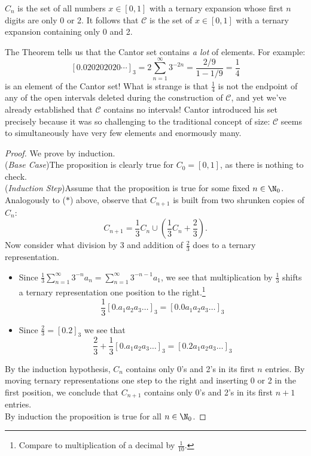 \begin{thm}
$C_n$ is the set of all numbers $x\in[0,1]$ with a ternary expansion whose first $n$ digits are only 0 or 2. It follows that $\mathcal C$ is the set of $x\in[0,1]$ with a ternary expansion containing only 0 and 2.
\end{thm}

\noindent The Theorem tells us that the Cantor set contains \emph{a lot} of elements. For example:
\[[0.020202020\cdots]_3=2\sum_{n=1}^\infty 3^{-2n}=\frac{2/9}{1-1/9}=\frac 14\]
is an element of the Cantor set! What is strange is that $\frac 14$ is not the endpoint of any of the open intervals deleted during the construction of $\mathcal C$, and yet we've already established that $\mathcal C$ contains no intervals! Cantor introduced his set precisely because it was so challenging to the traditional concept of size: $\mathcal C$ seems to simultaneously have very few elements and enormously many.

\begin{proof}
We prove by induction.\\[2pt]
(\emph{Base Case})\quad The proposition is clearly true for $C_0=[0,1]$, as there is nothing to check.\\[2pt]
(\emph{Induction Step})\quad Assume that the proposition is true for some fixed $n\in\N_0$. Analogously to ($\ast$) above, observe that $C_{n+1}$ is built from two shrunken copies of $C_n$:
\[C_{n+1}=\frac 13C_n\cup\left(\frac 13C_n+\frac 23\right).\]
Now consider what division by 3 and addition of $\frac 23$ does to a ternary representation.
\begin{itemize}
  \item Since $\frac 13\sum_{n=1}^\infty 3^{-n}a_n=\sum_{n=1}^\infty 3^{-n-1}a_1$, we see that multiplication by $\frac 13$ shifts a ternary representation one position to the right.\footnote{Compare to multiplication of a decimal by $\frac 1{10}$.}
	\[\frac 13[0.a_1a_2a_3\ldots]_3=[0.0a_1a_2a_3\ldots]_3\]
	\item Since $\frac 23=[0.2]_3$ we see that
	\[\frac 23+\frac 13[0.a_1a_2a_3\ldots]_3=[0.2a_1a_2a_3\ldots]_3\]
\end{itemize}
By the induction hypothesis, $C_n$ contains only 0's and 2's in its first $n$ entries. By moving ternary representations one step to the right and inserting 0 or 2 in the first position, we conclude that $C_{n+1}$ contains only 0's and 2's in its first $n+1$ entries.\\[2pt]
By induction the proposition is true for all $n\in\N_0$.
\end{proof}

